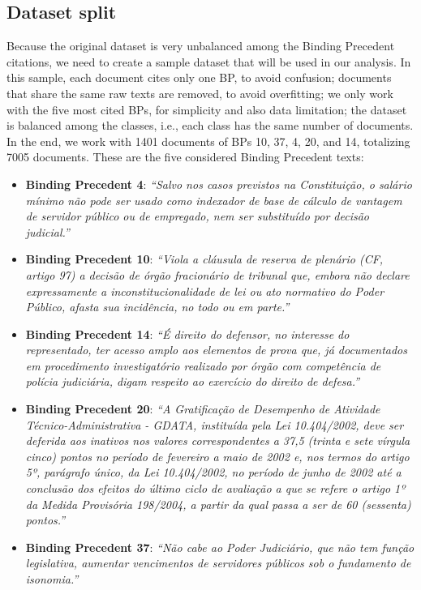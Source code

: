 \subsection{Dataset split}

    Because the original dataset is very unbalanced among the Binding Precedent citations, we need to create a sample dataset that will be used in our analysis. In this sample, each document cites only one BP, to avoid confusion; documents that share the same raw texts are removed, to avoid overfitting; we only work with the five most cited BPs, for simplicity and also data limitation; the dataset is balanced among the classes, i.e., each class has the same number of documents. In the end, we work with 1401 documents of BPs 10, 37, 4, 20, and 14, totalizing 7005 documents. These are the five considered Binding Precedent texts:

    \begin{itemize}
            \item \textbf{Binding Precedent 4}: \textit{``Salvo nos casos previstos na Constituição, o salário mínimo não pode ser usado como indexador de base de cálculo de vantagem de servidor público ou de empregado, nem ser substituído por decisão judicial.''}
            \item \textbf{Binding Precedent 10}: \textit{``Viola a cláusula de reserva de plenário (CF, artigo 97) a decisão de órgão fracionário de tribunal que, embora não declare expressamente a inconstitucionalidade de lei ou ato normativo do Poder Público, afasta sua incidência, no todo ou em parte.''}
            \item \textbf{Binding Precedent 14}: \textit{``É direito do defensor, no interesse do representado, ter acesso amplo aos elementos de prova que, já documentados em procedimento investigatório realizado por órgão com competência de polícia judiciária, digam respeito ao exercício do direito de defesa.''}
            \item \textbf{Binding Precedent 20}: \textit{``A Gratificação de Desempenho de Atividade Técnico-Administrativa - GDATA, instituída pela Lei 10.404/2002, deve ser deferida aos inativos nos valores correspondentes a 37,5 (trinta e sete vírgula cinco) pontos no período de fevereiro a maio de 2002 e, nos termos do artigo 5º, parágrafo único, da Lei 10.404/2002, no período de junho de 2002 até a conclusão dos efeitos do último ciclo de avaliação a que se refere o artigo 1º da Medida Provisória 198/2004, a partir da qual passa a ser de 60 (sessenta) pontos.''}
            \item \textbf{Binding Precedent 37}: \textit{``Não cabe ao Poder Judiciário, que não tem função legislativa, aumentar vencimentos de servidores públicos sob o fundamento de isonomia.''}
    \end{itemize}

